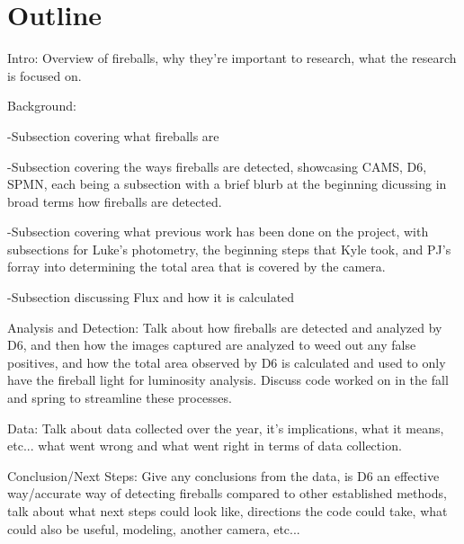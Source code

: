 \chapter{Outline}

Intro: Overview of fireballs, why they're important to research, what the research is focused on.

Background: 

-Subsection covering what fireballs are

-Subsection covering the ways fireballs are detected, showcasing CAMS, D6, SPMN, each being a subsection with a brief blurb at the beginning dicussing in broad terms how fireballs are detected.

-Subsection covering what previous work has been done on the project, with subsections for Luke's photometry, the beginning steps that Kyle took, and PJ's forray into determining the total area that is covered by the camera.

-Subsection discussing Flux and how it is calculated

Analysis and Detection: Talk about how fireballs are detected and analyzed by D6, and then how the images captured are analyzed to weed out any false positives, and how the total area observed by D6 is calculated and used to only have the fireball light for luminosity analysis. Discuss code worked on in the fall and spring to streamline these processes.

Data: Talk about data collected over the year, it's implications, what it means, etc... what went wrong and what went right in terms of data collection.

Conclusion/Next Steps: Give any conclusions from the data, is D6 an effective way/accurate way of detecting fireballs compared to other established methods, talk about what next steps could look like, directions the code could take, what could also be useful, modeling, another camera, etc...

